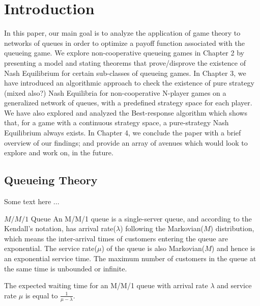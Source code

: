 \chapter{Introduction}

In this paper, our main goal is to analyze the application of game theory to networks of queues in order to optimize a payoff function associated with the queueing game. We explore non-cooperative queueing games in Chapter 2 by presenting a model and stating theorems that prove/disprove the existence of Nash Equilibrium for certain sub-classes of queueing games.
In Chapter 3, we have introduced an algorithmic approach to check the existence of pure strategy (mixed also?) Nash Equilibria for non-cooperative N-player games on a generalized network of queues, with a predefined strategy space for each player. We have also explored and analyzed the Best-response algorithm which shows that, for a game with a continuous strategy space, a pure-strategy Nash Equilibrium always exists.
In Chapter 4, we conclude the paper with a brief overview of our findings; and provide an array of avenues which would look to explore and work on, in the future.



\section{Queueing Theory}

Some text here ...

\begin{definition}\label{abc1}
$M/M/1$ Queue
	An M/M/1 queue is a single-server queue, and according to the Kendall's notation, has arrival rate($\lambda$) following the Markovian($M$) distribution, which means the inter-arrival times of customers entering the queue are exponential. The service rate($\mu$) of the queue	is also Markovian($M$) and hence is an exponential service time. The maximum number of customers in the queue at the same time is unbounded or infinite.
\end{definition}
\vspace{2mm}
\begin{theorem}
The expected waiting time for an M/M/1 queue with arrival rate $\lambda$ and service rate $\mu$ is equal to $\frac{1}{\mu - \lambda}$.
\end{theorem}

